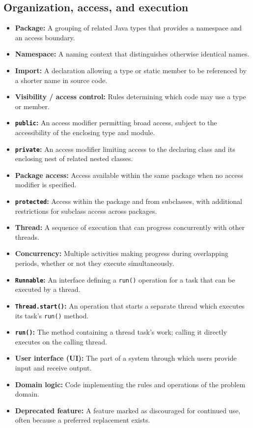 \documentclass[11pt]{article}
\newenvironment{DottedList}{%
  \begin{itemize}[leftmargin=2em, itemsep=0.35em, topsep=0.35em, label=\textbullet]
}{%
  \end{itemize}
}
\begin{document}
\subsection*{Organization, access, and execution}
\begin{DottedList}
  \item \textbf{Package:} A grouping of related Java types that provides a namespace and an access boundary.
  \item \textbf{Namespace:} A naming context that distinguishes otherwise identical names.
  \item \textbf{Import:} A declaration allowing a type or static member to be referenced by a shorter name in source code.
  \item \textbf{Visibility / access control:} Rules determining which code may use a type or member.
  \item \textbf{\texttt{public}:} An access modifier permitting broad access, subject to the accessibility of the enclosing type and module.
  \item \textbf{\texttt{private}:} An access modifier limiting access to the declaring class and its enclosing nest of related nested classes.
  \item \textbf{Package access:} Access available within the same package when no access modifier is specified.
  \item \textbf{\texttt{protected}:} Access within the package and from subclasses, with additional restrictions for subclass access across packages.
  \item \textbf{Thread:} A sequence of execution that can progress concurrently with other threads.
  \item \textbf{Concurrency:} Multiple activities making progress during overlapping periods, whether or not they execute simultaneously.
  \item \textbf{\texttt{Runnable}:} An interface defining a \texttt{run()} operation for a task that can be executed by a thread.
  \item \textbf{\texttt{Thread.start()}:} An operation that starts a separate thread which executes its task's \texttt{run()} method.
  \item \textbf{\texttt{run()}:} The method containing a thread task's work; calling it directly executes on the calling thread.
  \item \textbf{User interface (UI):} The part of a system through which users provide input and receive output.
  \item \textbf{Domain logic:} Code implementing the rules and operations of the problem domain.
  \item \textbf{Deprecated feature:} A feature marked as discouraged for continued use, often because a preferred replacement exists.
\end{DottedList}
\newpage
\end{document}
